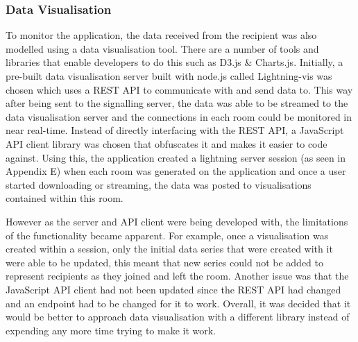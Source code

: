 \documentclass[]{report}
\begin{document}
				\subsubsection{Data Visualisation}
				To monitor the application, the data received from the recipient was also modelled using a data visualisation tool. There are a number of tools and libraries that enable developers to do this such as D3.js \& Charts.js. Initially, a pre-built data visualisation server built with node.js called Lightning-vis was chosen which uses a REST API to communicate with and send data to. This way after being sent to the signalling server, the data was able to be streamed to the data visualisation server and the connections in each room could be monitored in near real-time. Instead of directly interfacing with the REST API, a JavaScript API client library was chosen that obfuscates it and makes it easier to code against. Using this, the application created a lightning server session (as seen in Appendix E) when each room was generated on the application and once a user started downloading or streaming, the data was posted to visualisations contained within this room. 	
				
				However as the server and API client were being developed with, the limitations of the functionality became apparent. For example, once a visualisation was created within a session, only the initial data series that were created with it were able to be updated, this meant that new series could not be added to represent recipients as they joined and left the room. Another issue was that the JavaScript API client had not been updated since the REST API had changed and an endpoint had to be changed for it to work. Overall, it was decided that it would be better to approach data visualisation with a different library instead of expending any more time trying to make it work. 
\end{document}
